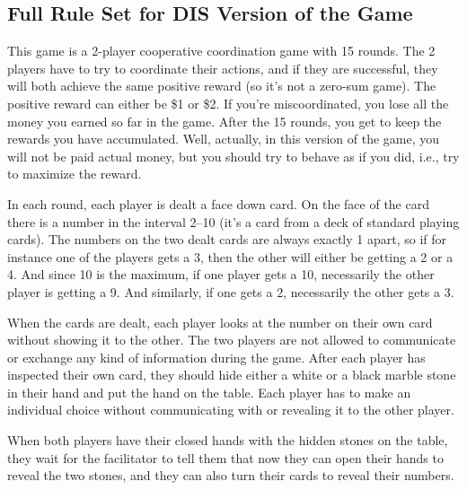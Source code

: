 \subsection{Full Rule Set for DIS Version of the Game}\label{app:dis-rules-full} 

This game is a 2-player cooperative coordination game with 15 rounds. The 2 players have to try to coordinate their actions, and if they are successful, they will both achieve the same positive reward (so it's not a zero-sum game). The positive reward can either be \$1 or \$2. If you're miscoordinated, you lose all the money you earned so far in the game. After the 15 rounds, you get to keep the rewards you have accumulated. Well, actually, in this version of the game, you will not be paid actual money, but you should try to behave as if you did, i.e., try to maximize the reward.

  

In each round, each player is dealt a face down card. On the face of the card there is a number in the interval 2--10 (it's a card from a deck of standard playing cards). The numbers on the two dealt cards are always exactly 1 apart, so if for instance one of the players gets a 3, then the other will either be getting a 2 or a 4. And since 10 is the maximum, if one player gets a 10, necessarily the other player is getting a 9. And similarly, if one gets a 2, necessarily the other gets a 3.  

When the cards are dealt, each player looks at the number on their own card without showing it to the other. The two players are not allowed to communicate or exchange any kind of information during the game. After each player has inspected their own card, they should hide either a white or a black marble stone in their hand and put the hand on the table. Each player has to make an individual choice without communicating with or revealing it to the other player. 

When both players have their closed hands with the hidden stones on the table, they wait for the facilitator to tell them that now they can open their hands to reveal the two stones, and they can also turn their cards to reveal their numbers.  

